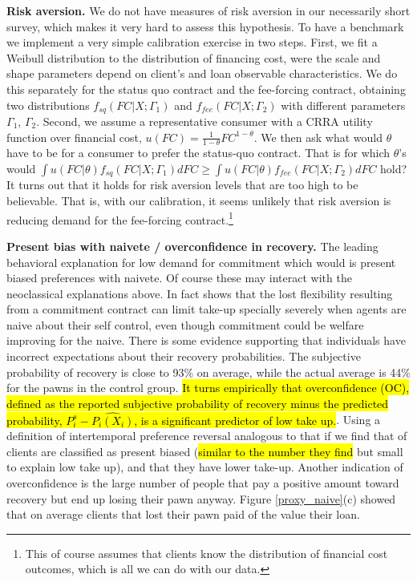 \documentclass[11pt]{article}
\begin{document}
\vspace{.1in}
\noindent \textbf{Risk aversion.} We do not have measures of risk aversion in our necessarily short survey, which makes it very hard to assess this hypothesis. To have a benchmark we implement a very simple calibration exercise in two steps. First, we fit a Weibull distribution to the distribution of financing cost, were the scale and shape parameters depend on client's and loan observable characteristics. We do this separately for the status quo contract and the fee-forcing contract, obtaining two distributions $f_{sq}(FC|X;\Gamma_1)$ and  $f_{fee}(FC|X;\Gamma_2)$ with different parameters $\Gamma_1$, $\Gamma_2$. Second, we assume a representative consumer with a CRRA utility function over financial cost, $u(FC)=\frac{1}{1-\theta}FC^{1-\theta}$. We then ask what would $\theta$ have to be for a consumer to prefer the status-quo contract. That is for which $\theta$'s would  $\int u(FC|\theta)f_{sq}(FC|X;\Gamma_1) dFC \geq \int u(FC|\theta)f_{fee}(FC|X;\Gamma_2) dFC $ hold? It turns out that it holds for risk aversion levels that are too high to be believable. That is, with our calibration, it seems unlikely that risk aversion is reducing demand for the fee-forcing contract.\footnote{This of course assumes that clients know the distribution of financial cost outcomes, which is all we can do with our data.}

\vspace{.1in}
\noindent \textbf{Present bias with naivete /  overconfidence in recovery.} The leading behavioral explanation for low demand for commitment which would is present biased preferences with naivete. Of course these may interact with the neoclassical explanations above. In fact \cite{Laibson2015} shows that the lost flexibility resulting from a commitment contract can limit take-up specially severely when agents are naive about their self control, even though commitment could be welfare improving for the naive. There is some evidence supporting that individuals have incorrect expectations about their recovery probabilities. The subjective probability of recovery is close to 93\% on average, while the actual average is 44\% for the pawns in the control group. \hl{It turns empirically that overconfidence (OC), defined as the reported subjective probability of recovery minus the predicted probability, $P^s_i-\widehat{P_i(X_i)}$, is a significant predictor of low take up.}. Using a definition of intertemporal preference reversal analogous to that if \cite{Ashraf} we find that  of clients are classified as present biased (\hl{similar to the number they find} but small to explain low take up), and that they have lower take-up. Another indication of overconfidence is the large number of people that pay a positive amount toward recovery but end up losing their pawn anyway. Figure \ref{proxy_naive}(c) showed that on average clients that lost their pawn paid  of the value their loan. 
\end{document}
